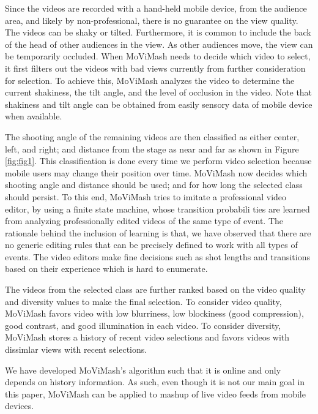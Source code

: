 \documentclass{sig-alternate}
\begin{document}
Since the videos are recorded with a hand-held mobile device,
from the audience area, and likely by non-professional, there is no
guarantee on the view quality. The videos can be shaky or tilted.
Furthermore, it is common to include the back of the head of other
audiences in the view. As other audiences move, the view can be
temporarily occluded. When MoViMash needs to decide which
video to select, it first filters out the videos with bad views currently from further consideration for selection. To achieve this, MoViMash analyzes the video to determine the current shakiness, the tilt angle, and the level of occlusion in the video. Note that shakiness and tilt angle can be obtained from easily sensory data of mobile device when available.



The shooting angle of the remaining videos are then classified as
either center, left, and right; and distance from the stage as near and
far as shown in Figure \ref{fig:fig1}. This classification is done every time we perform video selection because mobile users may change their position over time. MoViMash now decides which shooting angle and distance should be used; and for how long the selected class should persist. To this end, MoViMash tries to imitate a professional video editor, by using a finite state machine, whose transition probabili ties are learned from analyzing professionally edited videos of the same type of event. The rationale behind the inclusion of learning is that, we have observed that there are no generic editing rules that can be precisely defined to work with all types of events. The video editors make fine decisions such as shot lengths and transitions based on their experience which is hard to enumerate.

The videos from the selected class are further ranked based on
the video quality and diversity values to make the final selection. To consider video quality, MoViMash favors video with low blurriness, low blockiness (good compression), good contrast, and good illumination in each video. To consider diversity, MoViMash stores a history of recent video selections and favors videos with dissimlar views with recent selections.

We have developed MoViMash's algorithm such that it is online
and only depends on history information. As such, even though
it is not our main goal in this paper, MoViMash can be applied to
mashup of live video feeds from mobile devices.
\end{document}
